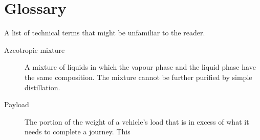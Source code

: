 
\chapter{Glossary} %

\label{AppendixB} %

A list of technical terms that might be unfamiliar to the reader. 

\begin{description}
	\item[Azeotropic mixture]A mixture of liquids in which the vapour phase and the liquid phase have the same composition. The mixture cannot be further purified by simple distillation.
	\item[Payload]The portion of the weight of a vehicle's load that is in excess of what it needs to complete a journey. This 

\end{description}
